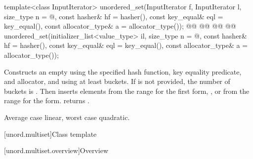 \documentclass{wg21}
\begin{document}
%
\begin{itemdecl}
template<class InputIterator>
unordered_set(InputIterator f, InputIterator l,
    size_type n = @\seebelow@,
    const hasher& hf = hasher(),
    const key_equal& eql = key_equal(),
    const allocator_type& a = allocator_type());
@@
@@
    @@
    @@
unordered_set(initializer_list<value_type> il,
    size_type n = @\seebelow@,
    const hasher& hf = hasher(),
    const key_equal& eql = key_equal(),
    const allocator_type& a = allocator_type());
\end{itemdecl}

\begin{itemdescr}
    \pnum
    \effects
    Constructs an empty  using the
    specified hash function, key equality predicate, and allocator, and
    using at least  buckets. If  is not
    provided, the number of buckets is . Then
    inserts elements from the range 
    for the first form, , or from the range
     for the  form.
     returns .
    
    \pnum
    \complexity
    Average case linear, worst case quadratic.
\end{itemdescr}

[unord.multiset]{Class template }%

[unord.multiset.overview]{Overview}
\end{document}
